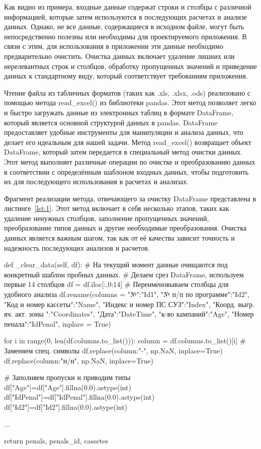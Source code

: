 Как видно из примера, входные данные содержат строки и столбцы с различной информацией, которые затем используются в последующих расчетах и анализе данных. Однако, не все данные, содержащиеся в исходном файле, могут быть непосредственно полезны или необходимы для проектируемого приложения. В связи с этим, для использования в приложении эти данные необходимо предварительно очистить. Очистка данных включает удаление лишних или нерелевантных строк и столбцов, обработку пропущенных значений и приведение данных к стандартному виду, который соответствует требованиям приложения.

Чтение файла из табличных форматов (таких как .xls, .xlsx, .ods) реализовано с помощью метода read\_excel() из библиотеки pandas. Этот метод позволяет легко и быстро загружать данные из электронных таблиц в формате DataFrame, который является основной структурой данных в pandas. DataFrame предоставляет удобные инструменты для манипуляции и анализа данных, что делает его идеальным для нашей задачи. Метод read\_excel() возвращает объект DataFrame, который затем передается в специальный метод очистки данных. Этот метод выполняет различные операции по очистке и преобразованию данных в соответствии с определённым шаблоном входных данных, чтобы подготовить их для последующего использования в расчетах и анализах. 

Фрагмент реализации метода, отвечающего за очистку DataFrame представлена в листинге~\ref{lst:1}. Этот метод включает в себя несколько этапов, таких как удаление ненужных столбцов, заполнение пропущенных значений, преобразование типов данных и другие необходимые преобразования. Очистка данных является важным шагом, так как от её качества зависит точность и надежность последующих анализов и расчетов.

\begin{flushleft}
 \label{lst:1}
\begin{MyCodes}
def _clear_data(self, df):
	# На текущий момент данные очищаются под конкретный шаблон пробных данных.
	# Делаем срез DataFrame, используем первые 14 столбцов
	df = df.iloc[:,0:14] 
	# Переименовываем столбцы для удобного анализа
	df.rename(columns = {
		"№":"Id1",
		"№ п/п по программе":"Id2",
		"Код  и номер кассеты":"Name",
		"Индекс и номер ПС СУЗ":"Index",
		"Коорд. выгр. яч. акт. зоны ":"Coordinates",
		"Дата":"DateTime",
		"к-во кампаний":"Age",
		"Номер пенала":"IdPenal"}, inplace = True)
	
	for i in range(0, len(df.columns.to_list())):
		column = df.columns.to_list()[i]
		# Заменяем спец. символы
		df.replace({column:"-"}, np.NaN, inplace=True) 
		df.replace({column:"н/н"}, np.NaN, inplace=True)
	
	# Заполняем пропуски и приводим типы
	df["Age"]=df["Age"].fillna(0.0).astype(int)
	df["IdPenal"]=df["IdPenal"].fillna(0.0).astype(int)
	df["Id2"]=df["Id2"].fillna(0.0).astype(int)
	
	...
	
	return penals, penals_id, cassetes

\end{MyCodes}
\end{flushleft}

